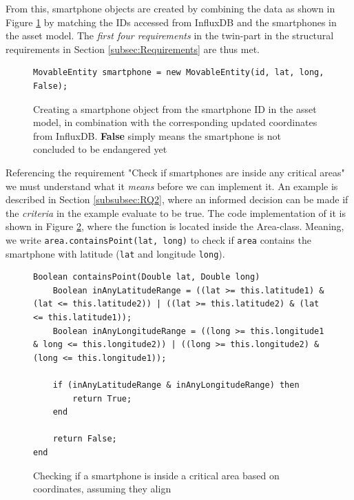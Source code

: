 \documentclass{article}
\begin{document}
From this, smartphone objects are created by combining the data as shown in Figure \ref{fig:smartphone_object} by matching the IDs accessed from InfluxDB and the smartphones in the asset model. The \emph{first four requirements} in the twin-part in the structural requirements in Section \ref{subsec:Requirements} are thus met. 

\begin{figure}[H]
    \centering
    \begin{verbatim}
MovableEntity smartphone = new MovableEntity(id, lat, long, False);
    \end{verbatim}
    \caption{Creating a smartphone object from the smartphone ID in the asset model, in combination with the corresponding updated coordinates from InfluxDB. \textbf{False} simply means the smartphone is not concluded to be endangered yet}
    \label{fig:smartphone_object}
\end{figure}

Referencing the requirement "Check if smartphones are inside any critical areas" we must understand what it \emph{means} before we can implement it. An example is described in Section \ref{subsubsec:RQ2}, where an informed decision can be made if the \emph{criteria} in the example evaluate to be true. The code implementation of it is shown in Figure \ref{fig:inside_critical_area}, where the function is located inside the Area-class. Meaning, we write \verb|area.containsPoint(lat, long)| to check if \verb|area| contains the smartphone with latitude (\verb|lat| and longitude \verb|long|).


\begin{figure}[H]
    \centering
    \begin{small}
    \begin{verbatim}
Boolean containsPoint(Double lat, Double long)
    Boolean inAnyLatitudeRange = ((lat >= this.latitude1) & (lat <= this.latitude2)) | ((lat >= this.latitude2) & (lat <= this.latitude1));
    Boolean inAnyLongitudeRange = ((long >= this.longitude1 & long <= this.longitude2)) | ((long >= this.longitude2) & (long <= this.longitude1));

    if (inAnyLatitudeRange & inAnyLongitudeRange) then
        return True;
    end
        
    return False;
end
    \end{verbatim}
    \end{small}
    \caption{Checking if a smartphone is inside a critical area based on coordinates, assuming they align}
    \label{fig:inside_critical_area}
\end{figure}
\end{document}
